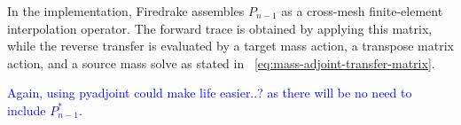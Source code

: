In the implementation, Firedrake assembles \(P_{n-1}\) as a cross-mesh finite-element interpolation operator. The forward trace is obtained by applying this matrix, while the reverse transfer is evaluated by a target mass action, a transpose matrix action, and a source mass solve as stated in ~\eqref{eq:mass-adjoint-transfer-matrix}.

\textcolor{blue}{Again, using pyadjoint could make life easier..? as there will be no need to include $P_{n-1}^{\ast}$.}

